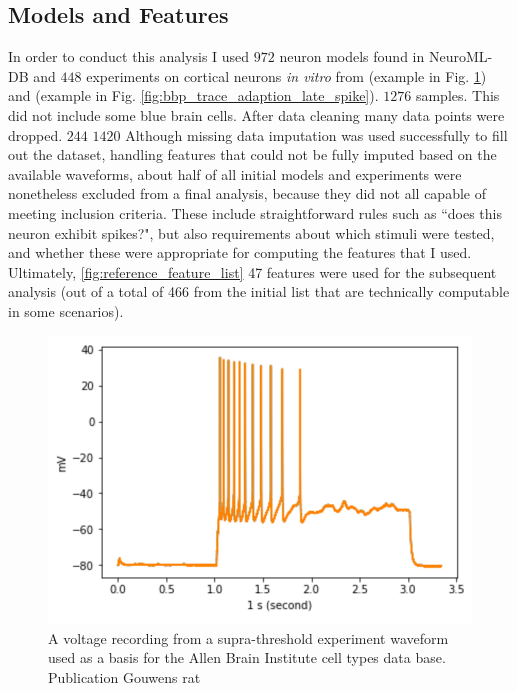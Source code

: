 


\subsection{Models and Features} 
In order to conduct this analysis I used $972$ neuron models found in NeuroML-DB \citep{} and $448$ experiments on cortical neurons \emph{in vitro} from \cite{gouwens2018systematic} (example in Fig. \ref{fig:adaptionm}) and \cite{markram2006blue} (example in Fig. \ref{fig:bbp_trace_adaption_late_spike}).
$1276$ samples. This did not include some blue brain cells. After data cleaning many data points were dropped.  $244$
$1420$
Although missing data imputation was used successfully to fill out the dataset, handling features that could not be fully imputed based on the available waveforms, about half of all initial models and experiments were nonetheless excluded from a final analysis, because they did not all capable of meeting inclusion criteria.
These include straightforward rules such as ``does this neuron exhibit spikes?", but also requirements about which stimuli were tested, and whether these were appropriate for computing the features that I used. 
Ultimately, \ref{fig:reference_feature_list}
47 features were used for the subsequent analysis (out of a total of 466 from the initial list that are technically computable in some scenarios).

\begin{figure}
    \begin{center}
    \includegraphics[width=0.6\linewidth]{figures/multi_spiking_large_allen}
    \caption[Example from Cell Types Database]{A voltage recording from a supra-threshold experiment waveform used as a basis for the Allen Brain Institute cell types data base. Publication Gouwens rat \citep{gouwens2018systematic}}
    \label{fig:adaptionm}
    \end{center}
\end{figure}    

